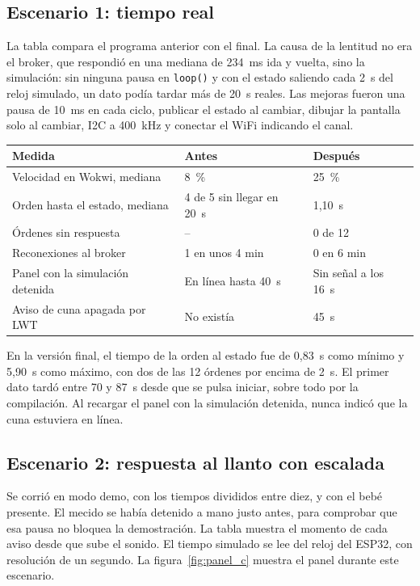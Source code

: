 \subsection*{Escenario 1: tiempo real}

La tabla compara el programa anterior con el final. La causa de la lentitud no era el
broker, que respondió en una mediana de 234~ms ida y vuelta, sino la simulación: sin
ninguna pausa en \texttt{loop()} y con el estado saliendo cada 2~s del reloj simulado, un
dato podía tardar más de 20~s reales. Las mejoras fueron una pausa de 10~ms en cada ciclo,
publicar el estado al cambiar, dibujar la pantalla solo al cambiar, I2C a 400~kHz y
conectar el WiFi indicando el canal.

\begin{center}
\small
\begin{tabular}{lll}
\hline
\textbf{Medida} & \textbf{Antes} & \textbf{Después} \\
\hline
Velocidad en Wokwi, mediana             & 8~\%                      & 25~\% \\
Orden hasta el estado, mediana          & 4 de 5 sin llegar en 20~s & 1,10~s \\
Órdenes sin respuesta                   & --                        & 0 de 12 \\
Reconexiones al broker                  & 1 en unos 4 min           & 0 en 6 min \\
Panel con la simulación detenida        & En línea hasta 40~s       & Sin señal a los 16~s \\
Aviso de cuna apagada por LWT           & No existía                & 45~s \\
\hline
\end{tabular}
\end{center}

En la versión final, el tiempo de la orden al estado fue de 0,83~s como mínimo y 5,90~s
como máximo, con dos de las 12 órdenes por encima de 2~s. El primer dato tardó entre 70 y
87~s desde que se pulsa iniciar, sobre todo por la compilación. Al recargar el panel con
la simulación detenida, nunca indicó que la cuna estuviera en línea.

\subsection*{Escenario 2: respuesta al llanto con escalada}

Se corrió en modo demo, con los tiempos divididos entre diez, y con el bebé presente. El
mecido se había detenido a mano justo antes, para comprobar que esa pausa no bloquea la
demostración. La tabla muestra el momento de cada aviso desde que sube el sonido. El
tiempo simulado se lee del reloj del ESP32, con resolución de un segundo. La figura~\ref{fig:panel_c}
muestra el panel durante este escenario.

